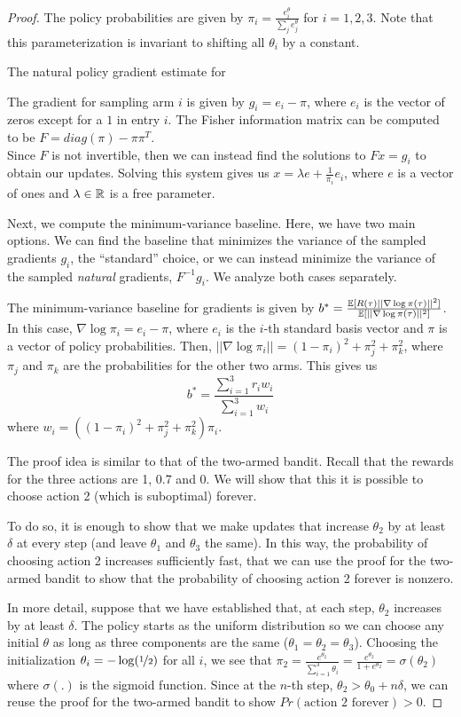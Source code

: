 \begin{proof}
The policy probabilities are given by $\pi_i = \frac{e^\theta_i}{\sum_j e^\theta_j}$ for $i =1,2,3$. 
Note that this parameterization is invariant to shifting all $\theta_i$ by a constant. 

The natural policy gradient estimate for 

The gradient for sampling arm $i$ is given by $g_i = e_i - \pi$, where $e_i$ is the vector of zeros except for a $1$ in entry $i$. 
The Fisher information matrix can be computed to be $F = diag(\pi) - \pi \pi^T$. \\
Since $F$ is not invertible, then we can instead find the solutions to $Fx = g_i$ to obtain our updates.
Solving this system gives us $x = \lambda e + \frac{1}{\pi_i} e_i$, where $e$ is a vector of ones and $\lambda \in \mathbb{R}$ is a free parameter.

Next, we compute the minimum-variance baseline. Here, we have two main options. We can find the baseline that minimizes the variance of the sampled gradients $g_i$, the ``standard'' choice, or we can instead minimize the variance of the sampled \textit{natural} gradients, $F^{-1}g_i$. 
We analyze both cases separately. 

The minimum-variance baseline for gradients is given by $b^* = \frac{\mathbb{E} [R(\tau) || \nabla \log \pi(\tau)||^2]}{\mathbb{E} [|| \nabla \log \pi(\tau)||^2] } $. 
In this case, $\nabla \log \pi_i = e_i - \pi$, where $e_i$ is the $i$-th standard basis vector and $\pi$ is a vector of policy probabilities. 
Then, $|| \nabla \log \pi_i|| = (1-\pi_i)^2 + \pi_j^2 + \pi_k^2$, where $\pi_j$ and $\pi_k$ are the probabilities for the other two arms.
This gives us
\[ b^* = \frac{\sum_{i=1}^3 r_i w_i }{\sum_{i=1}^3 w_i}  \]
where $w_i = ((1-\pi_i)^2 + \pi_j^2 + \pi_k^2) \pi_i $.


The proof idea is similar to that of the two-armed bandit. Recall that the rewards for the three actions are 1, 0.7 and 0. We will show that this it is possible to choose action 2 (which is suboptimal) forever. 

To do so, it is enough to show that we make updates that increase $\theta_2$ by at least $\delta$ at every step (and leave $\theta_1$ and $\theta_3$ the same). In this way, the probability of choosing action 2 increases sufficiently fast, that we can use the proof for the two-armed bandit to show that the probability of choosing action 2 forever is nonzero.

In more detail, suppose that we have established that, at each step, $\theta_2$ increases by at least $\delta$. 
The policy starts as the uniform distribution so we can choose any initial $\theta$ as long as three components are the same ($\theta_1 = \theta_2 = \theta_3$).
Choosing the initialization $\theta_i = - \log(\nicefrac{1}{2})$ for all $i$, we see that $\pi_2 = \frac{e^{\theta_2}}{\sum_{i=1}^3 \theta_i} = \frac{e^{\theta_2}}{1 + e^{\theta_2}} = \sigma(\theta_2)$ where $\sigma(.)$ is the sigmoid function. 
Since at the $n$-th step, $\theta_2 > \theta_0 + n\delta$, we can reuse the proof for the two-armed bandit to show $Pr(\text{action 2 forever}) > 0$.



\end{proof}
